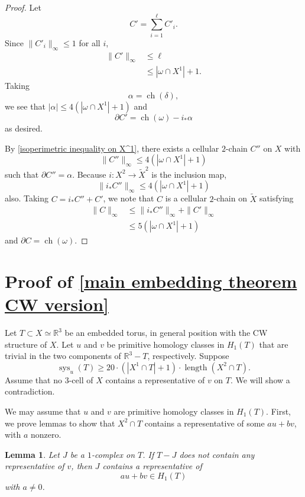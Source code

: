 \documentclass[12pt]{amsart}
\DeclareMathOperator*{\ch}{ch}
\DeclareMathOperator*{\length}{length}
\DeclareMathOperator*{\sys}{sys}
\newtheorem{lemma}[theorem]{Lemma}
\theoremstyle{definition}
\begin{document}
\begin{proof}
Let $$C'=\sum_{i=1}^{\ell}C'_i.$$ Since $\|C'_i\|_\infty\leq 1$ for all $i$, 
\begin{align*}\|C'\|_\infty&\leq \ell\\ &\leq  |\omega\cap X^1|+1.
\end{align*} Taking $$\alpha=\ch(\delta),$$ we see that $|\alpha|\leq 4(|\omega\cap X^1|+1)$ and $$\partial C'=\ch(\omega)-i_*\alpha$$ as desired. 

By \cref{isoperimetric inequality on X^1}, there exists a cellular $2$-chain $C''$ on $X$ with $$\|C''\|_\infty\leq 4(|\omega\cap X^1|+1)$$ such that $\partial C''=\alpha$. Because $i:X^2\to \widetilde{X}^2$ is the inclusion map, $$\|i_*C''\|_\infty\leq  4(|\omega\cap X^1|+1)$$ also. Taking $C=i_*C''+C'$, we note that $C$ is a cellular $2$-chain on $\widetilde{X}$ satisfying \begin{align*}\|C\|_\infty&\leq \|i_*C''\|_\infty+\|C'\|_\infty\\&\leq 5(|\omega\cap X^1|+1)
\end{align*} and $\partial C=\ch(\omega)$.
\end{proof}

\section{Proof of \cref{main embedding theorem CW version}}\label{proof of CW intersection}

Let $T\subset X\simeq \mathbb{R}^3$ be an embedded torus, in general position with the CW structure of $X$. Let $u$ and $v$ be primitive homology classes in $H_1(T)$ that are trivial in the two components of $\mathbb{R}^3-T$, respectively. Suppose $$\textstyle\sys_u(T)\geq 20\cdot(|X^1\cap T|+1)\cdot\length(X^2\cap T).$$ Assume that no $3$-cell of $X$ contains a representative of $v$ on $T$. We will show a contradiction. 

We may assume that $u$ and $v$ are primitive homology classes in $H_1(T)$. First, we prove lemmas to show that $X^2\cap T$ contains a representative of some $au+bv$, with $a$ nonzero.

\begin{lemma} \label{1-complex on torus} Let $J$ be a $1$-complex on $T$. If $T- J$ does not contain any representative of $v$, then $J$ contains a representative of $$au+bv\in H_1(T)$$ with $a\neq 0$.
\end{lemma}
\end{document}
